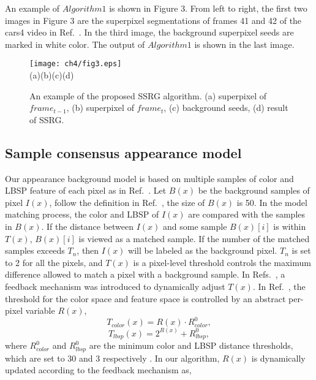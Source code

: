 An example of $Algorithm 1$ is shown in Figure 3. From left to right, the first two images in Figure 3 are the superpixel segmentations of frames 41 and 42 of the cars4 video in Ref.~. In the third image, the background superpixel seeds are marked in white color. The output of $Algorithm 1$ is shown in the last image.
\begin{figure*}[!htbp]
\begin{center}
\texttt{[image: ch4/fig3.eps]}\\
  (a)\quad\quad\quad\quad\quad\quad\quad\quad(b)\quad\quad\quad\quad\quad\quad\quad\quad(c)\quad\quad\quad\quad\quad\quad\quad\quad(d)
\end{center}

\caption{An example of the proposed SSRG algorithm. (a) superpixel of $frame_{t-1}$, (b) superpixel of $frame_{t}$, (c) background seeds, (d) result of SSRG.}
\label{fig:3}       %
\end{figure*}
\subsection{Sample consensus appearance model}
\label {sec:3.3}
Our appearance background model is based on multiple samples of color and LBSP feature of each pixel as in Ref.~. Let $B(x)$ be the background samples of pixel $I(x)$, follow the definition in Ref.~, the size of $B(x)$ is 50. In the model matching process, the color and LBSP of $I(x)$ are compared with the samples in $B(x)$. If the distance between $I(x)$ and some sample $B(x)[i]$ is within  $T(x)$, $B(x)[i]$ is viewed as a matched sample. If the number of the matched samples exceeds $ T_{n}$, then $I(x)$ will be labeled as the background pixel. $T_{n}$ is set to 2 for all the pixels, and $T(x)$ is a pixel-level threshold controls the maximum difference allowed to match a pixel with a background sample. In Refs.~, a feedback mechanism was introduced to dynamically adjust $T(x)$. In Ref.~, the threshold for the color space and feature space is controlled by an abstract per-pixel variable $R(x)$,
$$T_{color}(x) = R(x) \cdot R^{0}_{color},$$
$$T_{lbsp}(x) = 2^{R(x)} + R^{0}_{lbsp},$$
where $R^{0}_{color}$ and $R^{0}_{lbsp}$ are the minimum color and LBSP distance thresholds, which are set to 30 and 3 respectively \cite{subsenseTIP}. In our algorithm, $R(x)$ is dynamically updated according to the feedback mechanism as,

